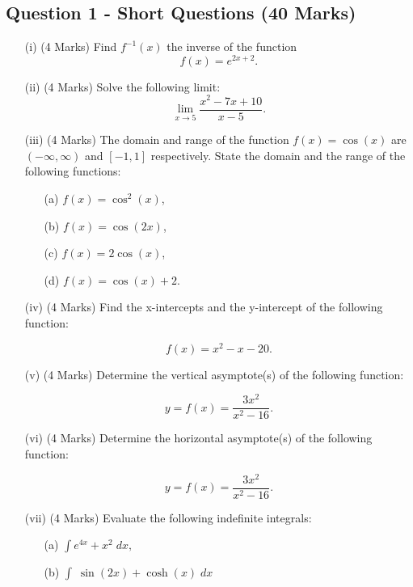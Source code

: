 \documentclass[a4paper,12pt]{article}
\begin{document}
\subsection*{Question 1 - Short Questions (40 Marks)}

\begin{itemize}
	
	\item[(i)](4 Marks) Find $f^{-1}(x)$ the inverse of the function
	\[f(x) = e^{2x+2}. \]
		\smallskip
	\item[(ii)](4 Marks)	Solve the following limit:
	\[\lim_{x \to 5 } \frac{x^2- 7x +10}{x-5}.\]
	\smallskip
	\item[(iii)] (4 Marks) The domain and range of the function $f(x) = \cos(x)$ are $(-\infty, \infty)$ and $[-1,1]$ respectively. State the domain and the range of the following functions:
	\begin{multicols}{2}
		\begin{itemize}
		
		
	\item[(a)] $f(x) = \cos^2(x)  $,
		\item[(b)] $f(x) = \cos(2x)  $,
	\item[(c)] $f(x) = 2\cos(x)  $,
		\item[(d)] $f(x) = \cos(x) +2$.
	\end{itemize}
	\end{multicols}
	\smallskip

	
	\item[(iv)] (4 Marks) Find the x-intercepts and the y-intercept of the following function:
	
	\[ f(x) = x^2 - x - 20 . \]
	
	\smallskip
	\item[(v)] (4 Marks) Determine the vertical asymptote(s) of the following function:
	
	
	\[ y = f(x) = \frac{3x^2}{x^2-16}. \]	
	\smallskip
	\item[(vi)] (4 Marks) Determine the horizontal asymptote(s) of the following function:
	
	\[ y = f(x) = \frac{3x^2}{x^2-16}.\]
		
	\smallskip
	\newpage
	\item[(vii)] (4 Marks) Evaluate the following indefinite integrals:
	\begin{multicols}{2}
	\begin{itemize}
		\item[(a)] $\displaystyle{ \int  e^{4x} + x^2\; dx, }  $
		\item[(b)] $\displaystyle{ \int \;\sin(2x)+ \cosh(x)\; dx}$
		

\end{itemize}
\end{multicols}
\end{itemize}
\end{document}
